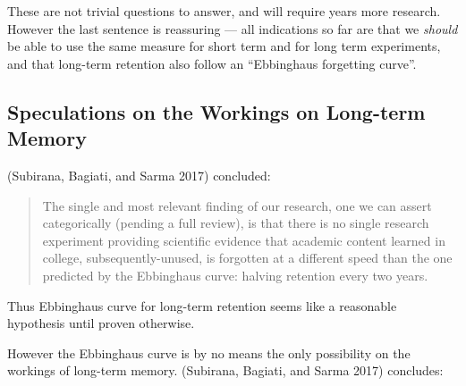 These are not trivial questions to answer, and will require years more
research. However the last sentence is reassuring --- all indications so
far are that we \emph{should} be able to use the same measure for short
term and for long term experiments, and that long-term retention also
follow an ``Ebbinghaus forgetting curve''.

\subsection{Speculations on the Workings on Long-term
Memory}\label{speculations-on-the-workings-on-long-term-memory}

(Subirana, Bagiati, and Sarma 2017) concluded:

\begin{quote}
The single and most relevant finding of our research, one we can assert
categorically (pending a full review), is that there is no single
research experiment providing scientific evidence that academic content
learned in college, subsequently-unused, is forgotten at a different
speed than the one predicted by the Ebbinghaus curve: halving retention
every two years.
\end{quote}

Thus Ebbinghaus curve for long-term retention seems like a reasonable
hypothesis until proven otherwise.

However the Ebbinghaus curve is by no means the only possibility on the
workings of long-term memory. (Subirana, Bagiati, and Sarma 2017)
concludes:


